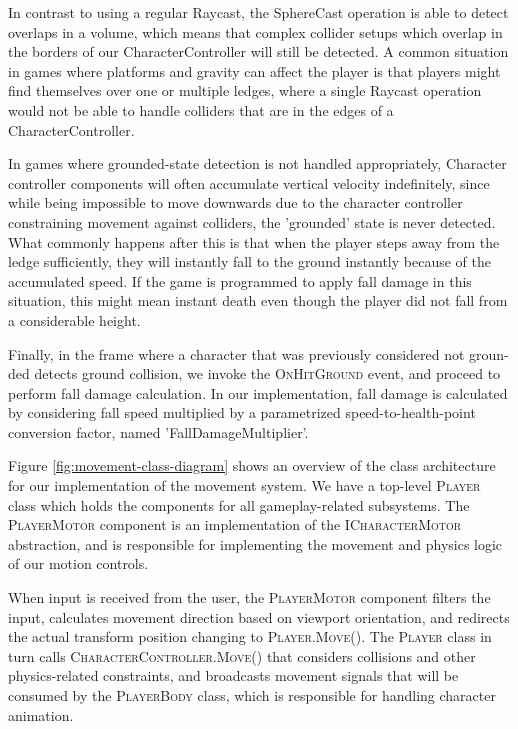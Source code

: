 In contrast to using a regular Raycast, the SphereCast operation is able to detect overlaps in a volume, which means that complex collider setups which overlap in the borders of our CharacterController will still be detected. A common situation in games where platforms and gravity can affect the player is that players might find themselves over one or multiple ledges, where a single Raycast operation would not be able to handle colliders that are in the edges of a CharacterController.


In games where grounded-state detection is not handled appropriately, Character controller components will often accumulate vertical velocity indefinitely, since while being impossible to move downwards due to the character controller constraining movement against colliders, the 'grounded' state is never detected. What commonly happens after this is that when the player steps away from the ledge sufficiently, they will instantly fall to the ground instantly because of the accumulated speed. If the game is programmed to apply fall damage in this situation, this might mean instant death even though the player did not fall from a considerable height.

Finally, in the frame where a character that was previously considered not groun\hyp{}ded detects ground collision, we invoke the \textsc{OnHitGround} event, and proceed to perform fall damage calculation. In our implementation, fall damage is calculated by considering fall speed multiplied by a parametrized speed-to-health-point conversion factor, named 'FallDamageMultiplier'.

Figure \ref{fig:movement-class-diagram} shows an overview of the class architecture for our implementation of the movement system. We have a top-level \textsc{Player} class which holds the components for all gameplay-related subsystems. The \textsc{PlayerMotor} component is an implementation of the \textsc{ICharacterMotor} abstraction, and is responsible for implementing the movement and physics logic of our motion controls.

When input is received from the user, the \textsc{PlayerMotor} component filters the input, calculates movement direction based on viewport orientation, and redirects the actual transform position changing to \textsc{Player.Move()}. The \textsc{Player} class in turn calls \textsc{CharacterController.Move()} that considers collisions and other physics-related constraints, and broadcasts movement signals that will be consumed by the \textsc{PlayerBody} class, which is responsible for handling character animation.

